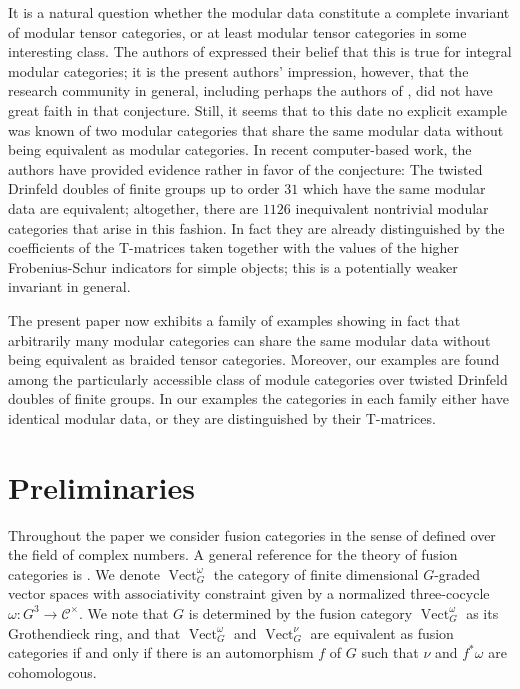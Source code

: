 \documentclass[12pt]{amsart}
\theoremstyle{remark}
\theoremstyle{definition}
\numberwithin{equation}{section}
\newcommand\Vect{\operatorname{Vect}}
\newcommand\C{\mathcal C}
\begin{document}
It is a natural question whether the modular data constitute a complete invariant of modular tensor categories, or at least modular tensor categories in some interesting class. The authors of \cite{MR3486174} expressed their belief that this is true for integral modular categories; it is the present authors' impression, however, that the research community in general, including perhaps the authors of \cite{MR3486174}, did not have great faith in that conjecture. Still, it seems that to this date no explicit example was known of two modular categories that share the same modular data without being equivalent as modular categories. In recent computer-based work, the authors have provided evidence rather in favor of the conjecture: The twisted Drinfeld doubles of finite groups up to order $31$ which have the same modular data are equivalent; altogether, there are $1126$ inequivalent nontrivial modular categories that arise in this fashion. In fact they are already distinguished by the coefficients of the T-matrices taken together with the values of the higher Frobenius-Schur indicators for simple objects; this is a potentially weaker invariant in general.%

The present paper now exhibits a family of examples showing in fact that arbitrarily many modular categories can share the same modular data without being equivalent as braided tensor categories. Moreover, our examples are found among the particularly accessible class of module categories over twisted Drinfeld doubles of finite groups. In our examples the categories in each family either have identical modular data, or they are distinguished by their T-matrices.

\section{Preliminaries}
\label{sec:prelims}

Throughout the paper we consider fusion categories in the sense of \cite{MR2183279} defined over the field of complex numbers. A general reference for the theory of fusion categories is \cite{MR3242743}. We denote $\Vect_G^\omega$ the category of finite dimensional $G$-graded vector spaces with associativity constraint given by a normalized three-cocycle $\omega\colon G^3\to \C^\times$. We note that $G$ is determined by the fusion category $\Vect_G^\omega$ as its Grothendieck ring, and that $\Vect_G^\omega$ and $\Vect_G^{\nu}$ are equivalent as fusion categories if and only if there is an automorphism $f$ of $G$ such that $\nu$ and $f^*\omega$ are cohomologous.
\end{document}
